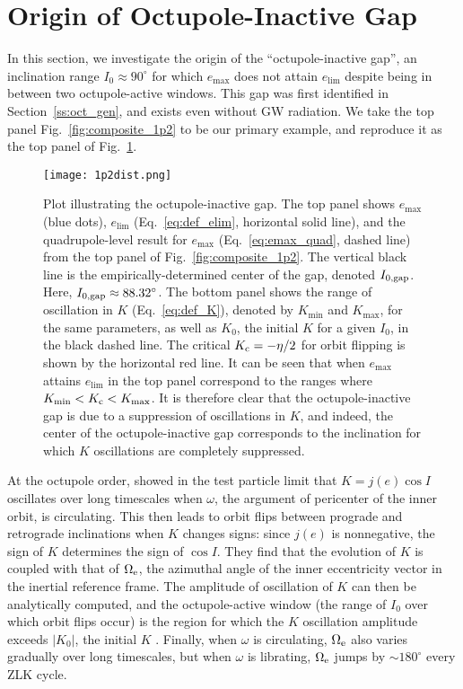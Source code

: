 \documentclass[
        fleqn,
        usenatbib,
    ]{mnras}
\newcommand*{\abs}[1]{\left|#1\right|}
\newlength{\colummwidth}
\begin{document}
\section{Origin of Octupole-Inactive Gap}\label{app:gap}

In this section, we investigate the origin of the ``octupole-inactive gap'', an
inclination range $I_0 \approx 90^\circ$ for which $e_{\max}$ does not attain
$e_{\lim}$ despite being in between two octupole-active windows. This gap was
first identified in Section~\ref{ss:oct_gen}, and exists even without GW
radiation. We take the top panel Fig.~\ref{fig:composite_1p2} to be our primary
example, and reproduce it as the top panel of Fig.~\ref{fig:kdist}.

\begin{figure}
    \centering
    \texttt{[image: 1p2dist.png]}
    \caption{Plot illustrating the octupole-inactive gap. The top panel shows
    $e_{\max}$ (blue dots), $e_{\lim}$ (Eq.~\ref{eq:def_elim}, horizontal
    solid line), and the quadrupole-level result for $e_{\max}$
    (Eq.~\ref{eq:emax_quad}, dashed line) from the top panel of
    Fig.~\ref{fig:composite_1p2}. The vertical black line is the
    empirically-determined center of the gap, denoted $I_{\rm 0, gap}$. Here,
    $I_{\rm 0, gap} \approx 88.32^\circ$. The bottom panel shows the range of
    oscillation in $K$ (Eq.~\ref{eq:def_K}), denoted by $K_{\min}$ and
    $K_{\max}$, for the same parameters, as well as $K_0$, the initial $K$ for a
    given $I_0$, in the black dashed line. The critical $K_{\rm c} = -\eta / 2$
    for orbit flipping is shown by the horizontal red line. It can be seen that
    when $e_{\max}$ attains $e_{\lim}$ in the top panel correspond to the ranges
    where $K_{\min} < K_{\rm c} < K_{\max}$. It is therefore clear that the
    octupole-inactive gap is due to a suppression of oscillations in $K$, and
    indeed, the center of the octupole-inactive gap corresponds to the
    inclination for which $K$ oscillations are completely suppressed.
    }\label{fig:kdist}
\end{figure}

At the octupole order, \citet{katz2011long} showed in the test particle limit
that $K = j(e) \cos I$ oscillates over long timescales when $\omega$, the
argument of pericenter of the inner orbit, is circulating. This then leads to
orbit flips between prograde and retrograde inclinations when $K$ changes signs:
since $j(e)$ is nonnegative, the sign of $K$ determines the sign of $\cos I$.
They find that the evolution of $K$ is coupled with that of $\Omega_{\rm e}$,
the azimuthal angle of the inner eccentricity vector in the inertial reference
frame. The amplitude of oscillation of $K$ can then be analytically computed,
and the octupole-active window (the range of $I_0$ over which orbit flips occur)
is the region for which the $K$ oscillation amplitude exceeds $\abs{K_0}$, the
initial $K$ \citep{katz2011long}. Finally, when $\omega$ is circulating,
$\Omega_{\rm e}$ also varies gradually over long timescales, but when $\omega$
is librating, $\Omega_{\rm e}$ jumps by $\sim 180^\circ$ every ZLK cycle.
\end{document}
